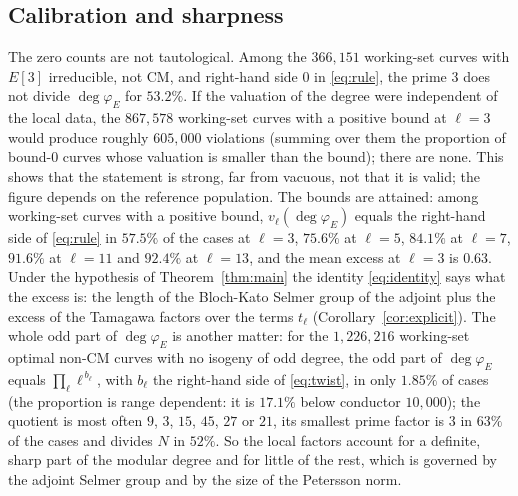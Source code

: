 \documentclass[11pt]{amsart}
\theoremstyle{definition}
\newcommand{\degphi}{\deg\varphi_E}
\begin{document}
\subsection{Calibration and sharpness}\label{sec:sharp}
The zero counts are not tautological. Among the $366{,}151$ working-set curves with $E[3]$ irreducible, not CM, and right-hand side $0$ in \eqref{eq:rule}, the prime $3$ does not divide $\degphi$ for $53.2\%$. If the valuation of the degree were independent of the local data, the $867{,}578$ working-set curves with a positive bound at $\ell=3$ would produce roughly $605{,}000$ violations (summing over them the proportion of bound-$0$ curves whose valuation is smaller than the bound); there are none. This shows that the statement is strong, far from vacuous, not that it is valid; the figure depends on the reference population. The bounds are attained: among working-set curves with a positive bound, $v_\ell(\degphi)$ equals the right-hand side of \eqref{eq:rule} in $57.5\%$ of the cases at $\ell=3$, $75.6\%$ at $\ell=5$, $84.1\%$ at $\ell=7$, $91.6\%$ at $\ell=11$ and $92.4\%$ at $\ell=13$, and the mean excess at $\ell=3$ is $0.63$. Under the hypothesis of Theorem~\ref{thm:main} the identity \eqref{eq:identity} says what the excess is: the length of the Bloch-Kato Selmer group of the adjoint plus the excess of the Tamagawa factors over the terms $t_\ell$ (Corollary~\ref{cor:explicit}). The whole odd part of $\degphi$ is another matter: for the $1{,}226{,}216$ working-set optimal non-CM curves with no isogeny of odd degree, the odd part of $\degphi$ equals $\prod_\ell\ell^{\,b_\ell}$, with $b_\ell$ the right-hand side of \eqref{eq:twist}, in only $1.85\%$ of cases (the proportion is range dependent: it is $17.1\%$ below conductor $10{,}000$); the quotient is most often $9$, $3$, $15$, $45$, $27$ or $21$, its smallest prime factor is $3$ in $63\%$ of the cases and divides $N$ in $52\%$. So the local factors account for a definite, sharp part of the modular degree and for little of the rest, which is governed by the adjoint Selmer group and by the size of the Petersson norm.
\end{document}
